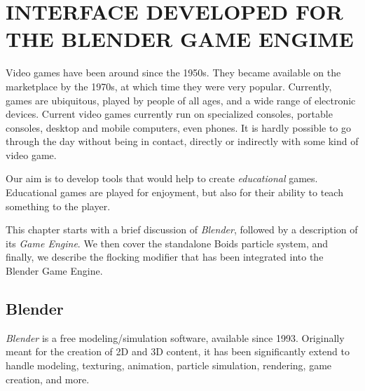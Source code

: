 \chapter{INTERFACE DEVELOPED FOR THE BLENDER GAME ENGIME}\label{chap5}


Video games have been around since the 1950s\cite{historyVideoGames}. 
They became available on the marketplace by the 1970s, at which time they were very popular. Currently, games are ubiquitous, played by people of all ages, 
and a wide range of electronic devices. Current video games currently run on specialized consoles, portable consoles, desktop and mobile computers, even phones. 
It is hardly possible to go through the day without being in contact, directly or indirectly with some kind of video game.

Our aim is to develop tools that would help to create \textit{educational} games. Educational games are played for enjoyment, but also for their ability to teach something to the player. 



This chapter starts with a brief discussion of \textit{Blender}, followed by a description of its \textit{Game Engine}. We then cover the standalone Boids particle system, and finally, we describe the flocking modifier that has been integrated into the Blender Game Engine. 

\section{Blender}\label{blenderSec}
\textit{Blender}\cite{blenderWeb} is a free modeling/simulation software, available since 1993. Originally meant for the creation of 2D and 3D content, it has been significantly extend to handle modeling, texturing, animation, particle simulation, rendering, game creation, and more. 

